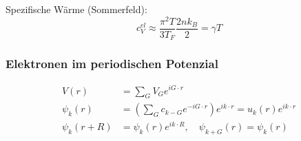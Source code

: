 Spezifische Wärme (Sommerfeld):
\begin{equation*}
    c_V^{el} \approx \frac{\pi^2 T}{3 T_F} \frac{2 nk_B}{2} = \gamma T
\end{equation*}

\subsubsection*{Elektronen im periodischen Potenzial}

\begin{equation*}
    \begin{aligned}
        V(r) &= \sum_G V_G e^{iG\cdot r} \\
        \psi_k(r) &= \left(\sum_G c_{k-G} e^{-iG \cdot r}\right) e^{ik \cdot r} = u_k(r) e^{ik \cdot r} \\
        \psi_k(r+R) &= \psi_k(r) e^{i k \cdot R}, \quad \psi_{k+G}(r) = \psi_k(r)
    \end{aligned}
\end{equation*}